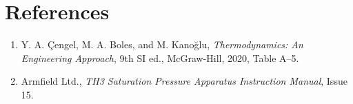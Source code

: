 \documentclass[11pt,a4paper]{article}
\begin{document}
\enlargethispage{3\baselineskip}
\section*{References}
\begin{enumerate}
  \item Y. A. \c{C}engel, M. A. Boles, and M. Kano\u{g}lu,
  \emph{Thermodynamics: An Engineering Approach}, 9th SI ed., McGraw-Hill,
  2020, Table A--5.
  \item Armfield Ltd., \emph{TH3 Saturation Pressure Apparatus Instruction Manual},
  Issue 15.
\end{enumerate}
\end{document}
